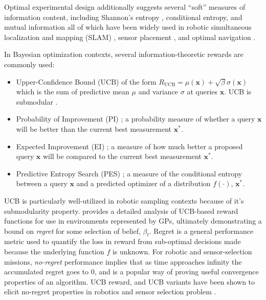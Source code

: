 Optimal experimental design additionally suggests several ``soft'' measures of information content, including Shannon's entropy \autocite{shannon1998mathematical}, conditional entropy, and mutual information all of which have been widely used in robotic simultaneous localization and mapping (SLAM) \autocite{burgard1997active, carrillo2015autonomous, bourgault2002information, valencia2018active}, sensor placement \autocite{guestrin2005near, papadimitriou2000entropy, Krause2008}, and optimal navigation \autocite{daniel2012hierarchical}.

In Bayesian optimization contexts, several information-theoretic rewards are commonly used:

\begin{itemize}
    \item Upper-Confidence Bound (UCB)\autocite{agrawal1995sample,auer2002using,snoek2012practical} of the form $R_{\text{UCB}} = \mu(\mathbf{x}) + \sqrt{\beta}\sigma(\mathbf{x})$ which is the sum of predictive mean $\mu$ and variance $\sigma$ at queries $\mathbf{x}$. UCB is submodular \autocite{nemhauser1978analysis}.
    \item Probability of Improvement (PI) \autocite{snoek2012practical,kushner1964new}; a probability measure of whether a query $\mathbf{x}$ will be better than the current best measurement $\mathbf{x}^*$.
    \item Expected Improvement (EI) \autocite{snoek2012practical,jones1998efficient}; a measure of how much better a proposed query $\mathbf{x}$ will be compared to the current best measurement $\mathbf{x}^*$.
    \item Predictive Entropy Search (PES) \autocite{hennig2012entropy,hernandez2014predictive}; a measure of the conditional entropy between a query $\mathbf{x}$ and a predicted optimizer of a distribution $f(\cdot)$, $\mathbf{x}^*$.
\end{itemize} 

UCB is particularly well-utilized in robotic sampling contexts because of it's submodularity property.
\cite{Srinivas2012} provides a detailed analysis of UCB-based reward functions for use in environments represented by GPs, ultimately demonstrating a bound on \emph{regret} for some selection of belief, $\beta_t$.
Regret is a general performance metric used to quantify the loss in reward from sub-optimal decisions made because the underlying function $f$ is unknown.
For robotic and sensor-selection missions, \emph{no-regret} performance implies that as time approaches infinity the accumulated regret goes to 0, and is a popular way of proving useful convergence properties of an algorithm.
UCB reward, and UCB variants have been shown to elicit no-regret properties in robotics and sensor selection problem \autocite{Sun2017,Srinivas2012,garivier2011kl}.


